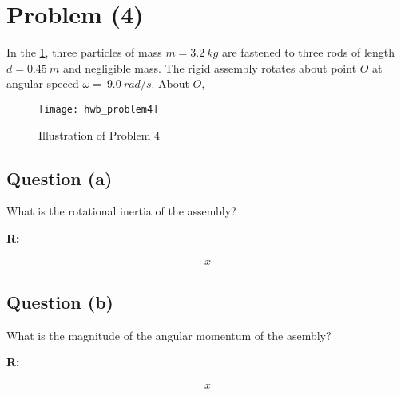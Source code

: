 \section{Problem (4)}
	In the \cref{fig:hwb_problem4}, three particles of mass $m = 3.2 \ kg$ are fastened to three rods of length $d = 0.45 \ m$ and negligible mass. The rigid assembly rotates about point $O$ at angular speeed $\omega = \ 9.0 \ rad/s$. About $O$,

	\begin{figure}[H]
		\begin{center}
			\texttt{[image: hwb\_problem4]}
			\caption{Illustration of Problem 4}
			\label{fig:hwb_problem4}
		\end{center}
	\end{figure}

	\subsection{Question (a)}

		What is the rotational inertia of the assembly?

		\textbf{R:}

		\begin{align}
			x
		\end{align}

	\subsection{Question (b)}

		What is the magnitude of the angular momentum of the asembly?

		\textbf{R:}

		\begin{align}
			x
		\end{align}
